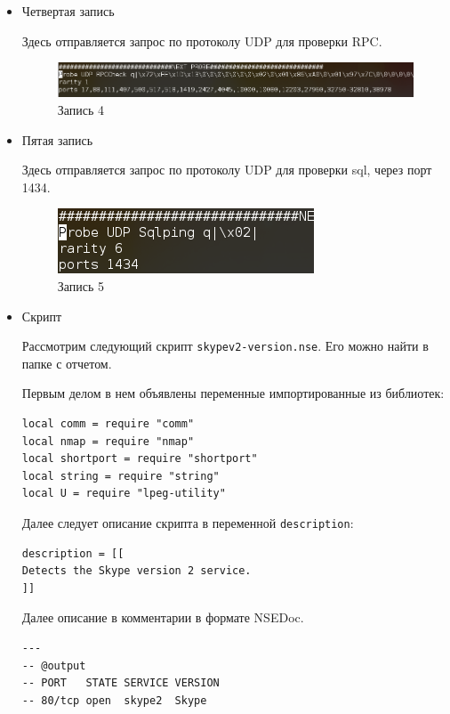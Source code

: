 \documentclass[11pt, a4paper]{article}		%
\begin{document}
\begin{itemize}
\item Четвертая запись

Здесь отправляется запрос по протоколу UDP для проверки RPC.

\begin{figure}[h!]
\centering
\includegraphics[scale=0.8]{res/probe_4}
\caption{Запись 4}
\end{figure}

\item Пятая запись

Здесь отправляется запрос по протоколу UDP для проверки sql, через порт 1434.


\begin{figure}[h!]
\centering
\includegraphics[scale=0.8]{res/probe_5}
\caption{Запись 5}
\end{figure}




\item Скрипт

Рассмотрим следующий скрипт \verb'skypev2-version.nse'. Его можно найти в папке с отчетом.

Первым делом в нем объявлены переменные импортированные из библиотек:

\begin{verbatim}
local comm = require "comm"
local nmap = require "nmap"
local shortport = require "shortport"
local string = require "string"
local U = require "lpeg-utility"
\end{verbatim}

Далее следует описание скрипта в переменной \verb'description':

\begin{verbatim}
description = [[
Detects the Skype version 2 service.
]]
\end{verbatim}

Далее описание в комментарии в формате NSEDoc.

\begin{verbatim}
---
-- @output
-- PORT   STATE SERVICE VERSION
-- 80/tcp open  skype2  Skype
\end{verbatim}


\end{itemize}
\end{document}
